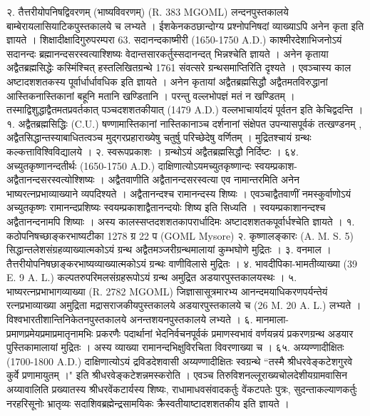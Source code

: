 २. तैत्तरीयोपनिषद्विवरणम् (भाष्यविवरणम्) (R. 383 MGOML) लन्दनपुस्तकालये बाम्बेरायलासियाटिकपुस्तकालये च लभ्यते । ईशकेनकठछान्दोग्य प्रश्नोपनिषदां व्याख्याऽपि अनेन कृता इति ज्ञायते ।
शिक्षादीक्षादिगुरुपरम्परा
63. सदानन्दकाष्मीरी (1650-1750 A.D.)
काश्मीरदेशाभिजनोऽयं सदानन्दः ब्रह्मानन्दसरस्वत्याश्शिष्यः वेदान्तसारकर्तुस्सदानन्दत् भिन्नश्चेति ज्ञायते । अनेन कृताया अद्वैतब्रह्मसिद्धेः कस्मिंश्चित् हस्तलिखितग्रन्थे 1761 संवत्सरे ग्रन्थसमाप्तिरिति दृश्यते । एवञ्चास्य काल अष्टादशशतकस्य पूर्वार्धार्धावधिक इति ज्ञायते ।
अनेन कृतायां अद्वैतब्रह्मसिद्धौ अद्वैतमतविरुद्धानां आस्तिकनास्तिकानां बहूनि मतानि खण्डितानि । परन्तु वल्लभोपज्ञं मतं न खण्डितम् । तस्माद्विशुद्धाद्वैतमतप्रवर्तकात् पञ्चदशशतकीयात् (1479 A.D.) वल्लभाचार्यादयं पूर्वतन इति केचिद्वदन्ति ।
१. अद्वैतब्रह्मसिद्धिः (C.U.)
षण्णामास्तिकानां नास्तिकानाञ्च दर्शनानां संक्षेपत उपन्यासपूर्वकं तत्खण्डनम् , अद्वैतसिद्धान्तस्याबाधितत्वञ्च मुद्गरप्रहाराख्येषु चतुर्षु परिच्छेदेषु वर्णितम् । मुद्रितश्चायं ग्रन्थः कल्कत्ताविश्विविद्यालये ।
२. स्वरूपप्रकाशः । ग्रन्थोऽयं अद्वैतब्रह्मसिद्धौ निर्दिष्टः ।
६४. अच्युतकृष्णानन्दतीर्थः (1650-1750 A.D.)
दाक्षिणात्योऽयमच्युतकृष्णान्दः स्वयम्प्रकाश-अद्वैतानन्दसरस्वत्योश्शिष्यः । अद्वैतवाणीति अद्वैतानन्दसरस्वत्या एव नामान्तरमिति अनेन भाष्यरत्नप्रभाव्याख्याने व्यपदिश्यते । अद्वैतानन्दश्च रामानन्दस्य शिष्यः । एवञ्चाद्वैतवाणीं नमस्कुर्वाणोऽयं अच्युतकृष्णः रामानन्दप्रशिष्यः स्वयम्प्रकाशाद्वैतानन्दयोः शिष्य इति सिध्यति । स्वयम्प्रकाशानन्दश्च अद्वैतानन्दनामपि शिष्याः । अस्य कालस्सप्तदशशतकापरार्धादिमः अष्टादशशतकपूर्वार्धश्चेति ज्ञायते ।
१. कठोपनिषच्छाङ्करभाष्यटीका 1278 ग्र 22 प (GOML Mysore)
२. कृष्णालङ्कारः (A. M. S. 5)
सिद्धान्तलेशसंग्रहव्याख्यात्मकोऽयं ग्रन्थ अद्वैतमञ्जरीग्रन्थमालायां कुम्भघोणे मुद्रितः ।
३. वनमाल । तैत्तरीयोपनिषछाङ्करभाष्यव्याख्यात्मकोऽयं ग्रन्थः वाणीविलासे मुद्रितः ।
४. भावदीपिका-भामतीव्याख्या (39 E. 9 A. L.)
कल्पतरुपरिमलसंग्रहरूपोऽयं ग्रन्थ अमुद्रित अडयारपुस्तकालयस्थः ।
५. भाष्यरत्नप्रभाभागव्याख्या (R. 2782 MGOML)
जिज्ञासासूत्रमारभ्य आनन्दमयाधिकरणपर्यन्तेयं रत्नप्रभाव्याख्या अमुद्रिता मद्रासराजकीयपुस्तकालये अडयारपुस्तकालये च (26 M. 20 A. L.) लभ्यते । विश्वभारतीशान्तिनिकेतनपुस्तकालये अनन्तशयनपुस्तकालये लभ्यते ।
६. मानमाला-
प्रमाणप्रमेयप्रमाप्रमातृनामभिः प्रकरणैः पदार्थानां भेदनिर्वचनपूर्वकं प्रमाणस्वभावं वर्णयन्नयं प्रकरणग्रन्थ अडयार पुस्तिकामालायां मुद्रितः । अस्य व्याख्या रामानन्दभिक्षुविरचिता विवरणाख्या च ।
६५. अय्यण्णादीक्षितः (1700-1800 A.D.)
दाक्षिणात्योऽयं द्रविडदेशवासी अय्यण्णादीक्षितः स्वग्रन्थे ``तस्मै श्रीधरवेङ्कटेशगुरवे कुर्वे प्रणामायुतम् ।" इति श्रीधरवेङ्कटेशन्नमस्करोति । एवञ्च तिरुविशनल्लूराख्यचोलदेशीयग्रामवासिन अय्यावालिति प्रख्यातस्य श्रीधरवेंकटार्यस्य शिष्यः, राधामाधवसंवादकर्तुः वेंकटपतेः पुत्रः, सुदन्ताकल्याणकर्तुः नरहरिसूनोः भ्रातृव्यः सदाशिवब्रह्मेन्द्रसामयिकः क्रैस्वतीयाष्टादशशतकीय इति ज्ञायते ।
